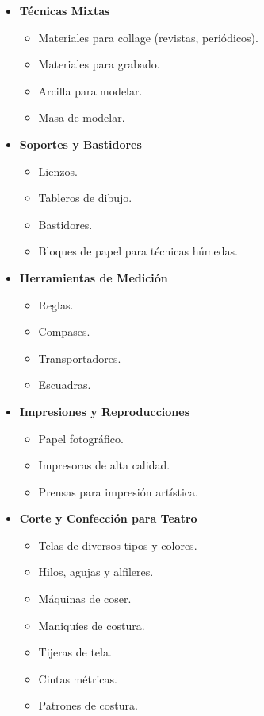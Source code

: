 \begin{itemize}
  \item \textbf{Técnicas Mixtas}
  \begin{itemize}
      \item Materiales para collage (revistas, periódicos).
      \item Materiales para grabado.
      \item Arcilla para modelar.
      \item Masa de modelar.
  \end{itemize}
  
  \item \textbf{Soportes y Bastidores}
  \begin{itemize}
      \item Lienzos.
      \item Tableros de dibujo.
      \item Bastidores.
      \item Bloques de papel para técnicas húmedas.
  \end{itemize}
  
  \item \textbf{Herramientas de Medición}
  \begin{itemize}
      \item Reglas.
      \item Compases.
      \item Transportadores.
      \item Escuadras.
  \end{itemize}
    
  \item \textbf{Impresiones y Reproducciones}
  \begin{itemize}
      \item Papel fotográfico.
      \item Impresoras de alta calidad.
      \item Prensas para impresión artística.
  \end{itemize}
  \item \textbf{Corte y Confección para Teatro}
  \begin{itemize}
      \item Telas de diversos tipos y colores.
      \item Hilos, agujas y alfileres.
      \item Máquinas de coser.
      \item Maniquíes de costura.
      \item Tijeras de tela.
      \item Cintas métricas.
      \item Patrones de costura.
  \end{itemize}
\end{itemize}